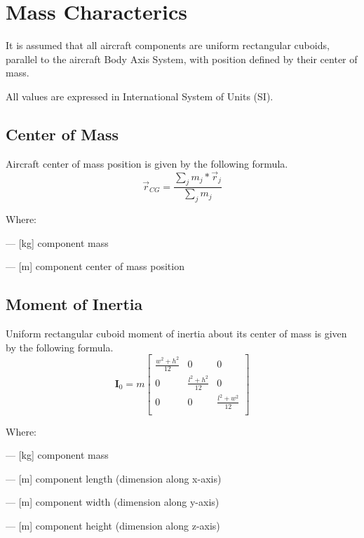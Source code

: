 \chapter{Mass Characterics}

It is assumed that all aircraft components are uniform rectangular cuboids, parallel to the aircraft Body Axis System, with position defined by their center of mass.

All values are expressed in International System of Units (SI).

\section{Center of Mass}

Aircraft center of mass position is given by the following formula. \cite{Taylor2005}
\begin{equation}
  \label{eq-center-of-mass}
  \vec{r}_{CG}
  =
  \frac{\sum_{j} m_j * \vec{r}_j}{\sum_{j} m_j}
\end{equation}

Where:
\begin{description}[align=right,labelwidth=1cm]
  \item [$m_j$]       --- [kg] component mass
  \item [$\vec{r}_j$] --- [m] component center of mass position
\end{description}

\section{Moment of Inertia}

Uniform rectangular cuboid moment of inertia about its center of mass is given by the following formula. \cite{Awrejcewicz2012}
\begin{equation}
  \label{eq-cuboid-inertia}
  {\boldsymbol I}_0
  =
  m
  \left[
    \begin{matrix}
      \frac{w^2 + h^2}{12} & 0 & 0 \\
      0 & \frac{l^2 + h^2}{12} & 0 \\
      0 & 0 & \frac{l^2 + w^2}{12} \\
    \end{matrix}
  \right]
\end{equation}

Where:
\begin{description}[align=right,labelwidth=1cm]
  \item [$m$] --- [kg] component mass
  \item [$l$] --- [m] component length (dimension along x-axis)
  \item [$w$] --- [m] component width (dimension along y-axis)
  \item [$h$] --- [m] component height (dimension along z-axis)
\end{description}

